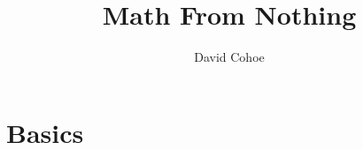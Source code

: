 \documentclass[12pt]{memoir}
\author{David Cohoe}
\title{Math From Nothing}
\date{}
\begin{document}
\maketitle

\tableofcontents



\part{Basics}















\end{document}
